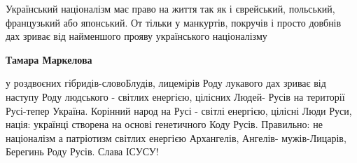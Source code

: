\begin{itemize}
Український націоналізм має право на життя так як і єврейський, польський,
французький або японський. От тільки у манкуртів, покручів і просто довбнів дах
зриває від найменшого прояву українського націоналізму

\begin{itemize} %
\textbf{Тамара Маркелова} 

у роздвоєних гібридів-словоБлудів, лицемірів Роду лукавого дах зриває від
наступу Роду людського - світлих енергією, цілісних Людей- Русів на території
Русі-тепер Україна. Корінний народ на Русі - світлі енергією, цілісні Люди
Руси, нація: українці створена на основі генетичного Коду Русів. Правильно: не
націоналізм а патріотизм світлих енергією Архангелів, Ангелів- мужів-Лицарів,
Берегинь Роду Русів. Слава ІСУСУ!

\end{itemize} %


\end{itemize} %
